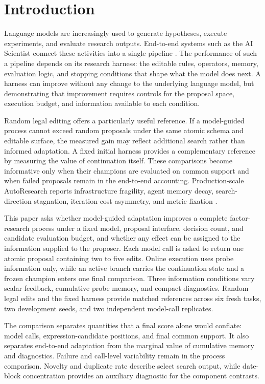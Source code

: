 \section{Introduction}
\label{sec:introduction}

Language models are increasingly used to generate hypotheses, execute experiments, and evaluate research outputs. End-to-end systems such as the AI Scientist connect these activities into a single pipeline \citep{lu2026towards}. The performance of such a pipeline depends on its research harness: the editable rules, operators, memory, evaluation logic, and stopping conditions that shape what the model does next. A harness can improve without any change to the underlying language model, but demonstrating that improvement requires controls for the proposal space, execution budget, and information available to each condition.

Random legal editing offers a particularly useful reference. If a model-guided process cannot exceed random proposals under the same atomic schema and editable surface, the measured gain may reflect additional search rather than informed adaptation. A fixed initial harness provides a complementary reference by measuring the value of continuation itself. These comparisons become informative only when their champions are evaluated on common support and when failed proposals remain in the end-to-end accounting. Production-scale AutoResearch reports infrastructure fragility, agent memory decay, search-direction stagnation, iteration-cost asymmetry, and metric fixation \citep{chandran2026production}.

This paper asks whether model-guided adaptation improves a complete factor-research process under a fixed model, proposal interface, decision count, and candidate evaluation budget, and whether any effect can be assigned to the information supplied to the proposer. Each model call is asked to return one atomic proposal containing two to five edits. Online execution uses probe information only, while an active branch carries the continuation state and a frozen champion enters one final comparison. Three information conditions vary scalar feedback, cumulative probe memory, and compact diagnostics. Random legal edits and the fixed harness provide matched references across six fresh tasks, two development seeds, and two independent model-call replicates.

The comparison separates quantities that a final score alone would conflate: model calls, expression-candidate positions, and final common support. It also separates end-to-end adaptation from the marginal value of cumulative memory and diagnostics. Failure and call-level variability remain in the process comparison. Novelty and duplicate rate describe select search output, while date-block concentration provides an auxiliary diagnostic for the component contrasts.

